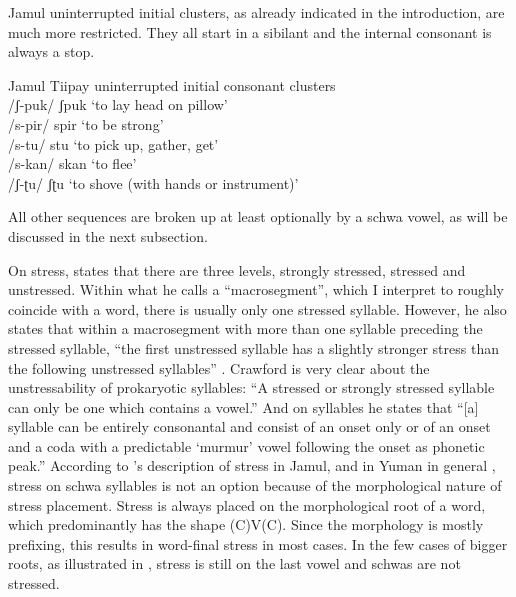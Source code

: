\documentclass[output=paper,colorlinks,citecolor=brown]{langscibook}
\begin{document}
Jamul uninterrupted initial clusters, as already indicated in the introduction, are much more restricted. They all start in a sibilant and the internal consonant is always a stop.

\begin{exe}
    \ex  \label{ex8} Jamul Tiipay uninterrupted initial consonant clusters \\
    /ʃ-puk/ \tab   ʃpuk   \tab ‘to lay head on pillow’\\
    /s-pir/ \tab   spir  \tab  ‘to be strong’\\
    /s-tu/  \tab      stu  \tab    ‘to pick up, gather, get’\\
    /s-kan/   \tab skan  \tab  ‘to flee’    \\  
    /ʃ{}-ʈu/  \tab    ʃʈu  \tab    ‘to shove (with hands or instrument)’
\end{exe}


All other sequences are broken up at least optionally by a schwa vowel, as will be discussed in the next subsection. 

\begin{sloppypar}
On stress, \citet[28]{Crawford1966} states that there are three levels, strongly stressed, stressed and unstressed. Within what he calls a “macrosegment”, which I interpret to roughly coincide with a word, there is usually only one stressed syllable. However, he also states that within a macrosegment with more than one syllable preceding the stressed syllable, “the first unstressed syllable has a slightly stronger stress than the following unstressed syllables” \citep[29]{Crawford1966}. Crawford is very clear about the unstressability of prokaryotic syllables: “A stressed or strongly stressed syllable can only be one which contains a vowel.” And on syllables he states that “[a] syllable can be entirely consonantal and consist of an onset only or of an onset and a coda with a predictable ‘murmur’ vowel following the onset as phonetic peak.” \citep[34]{Crawford1966} According to \citet{Miller2001}'s description of stress in Jamul, and in Yuman in general \citep{Langdon1975}, stress on schwa syllables is not an option because of the morphological nature of stress placement. Stress is always placed on the morphological root of a word, which predominantly has the shape (C)V(C). Since the morphology is mostly prefixing, this results in word-final stress in most cases. In the few cases of bigger roots, as illustrated in , stress is still on the last vowel and schwas are not stressed. 
\end{sloppypar}
\end{document}
